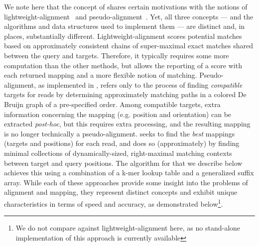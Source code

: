 We note here that the concept of \qm shares certain motivations with the notions of lightweight-alignment~\citep{patro2015salmon} and pseudo-alignment~\citep{Bray:2015:Kallisto}.  Yet, all three concepts --- and the algorithms and data structures used to implement them --- are distinct and, in places, substantially different.  Lightweight-alignment scores potential matches based on approximately consistent chains of super-maximal exact matches shared between the query and targets. Therefore, it typically requires some more computation than the other methods, but allows the reporting of a score with each returned mapping and a more flexible notion of matching.  Pseudo-alignment, as implemented in \kallisto, refers only to the process of finding \textit{compatible} targets for reads by determining approximately matching paths in a colored De Bruijn graph of a pre-specified order.  Among compatible targets, extra information concerning the mapping (e.g. position and orientation) can be extracted \textit{post-hoc}, but this requires extra processing, and the resulting mapping is no longer technically a pseudo-alignment.  \Qm seeks to find the \textit{best} mappings (targets and positions) for each read, and does so (approximately) by finding minimal collections of dynamically-sized, right-maximal matching contexts between target and query positions.  The algorithm for \qm that we describe below achieves this using a combination of a k-mer lookup table and a generalized suffix array.  While each of these approaches provide some insight into the problems of alignment and mapping, they represent distinct concepts and exhibit unique characteristics in terms of speed and accuracy, as demonstrated below\footnote{We do not compare against lightweight-alignment here, as no stand-alone implementation of this approach is currently available}.



\begin{figure*}
 \centering
 \texttt{[image: rapmap/\{Avi.RPE.fig.1]}.pdf}
  \caption{The transcriptome (consisting of transcripts $t_1,\ldots ,t_6$) is converted into a $\$$-separated string, $T$, upon which a suffix array, \SA{T}, and a hash table, $h$, are constructed. The mapping operation begins with a \kmer (here, $k=3$) mapping to an interval $\interval{b}{e}$ in \SA{T}.  Given this interval and the read, \MMP[i] and \NIP{\MMP[i]} are calculated as described in section \ref{sec:methods}. The search for the next hashable \kmer begins $k$ bases before \NIP{\MMP[i]}. }
  \label{fig:overview}
\end{figure*}

